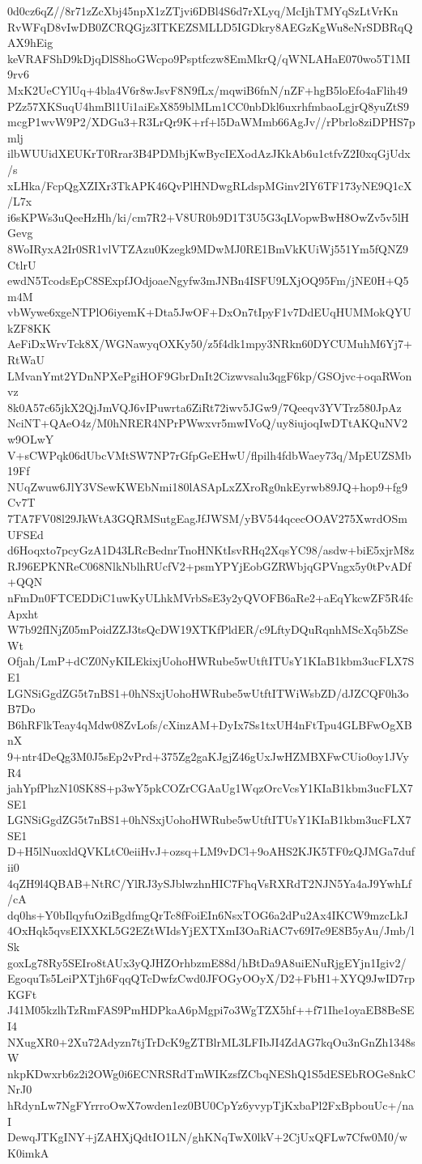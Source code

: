 0d0cz6qZ//8r71zZcXbj45npX1zZTjvi6DBl4S6d7rXLyq/McIjhTMYqSzLtVrKn
RvWFqD8vIwDB0ZCRQGjz3ITKEZSMLLD5IGDkry8AEGzKgWu8eNrSDBRqQAX9hEig
keVRAFShD9kDjqDlS8hoGWcpo9Psptfczw8EmMkrQ/qWNLAHaE070wo5T1MI9rv6
MxK2UeCYlUq+4bla4V6r8wJsvF8N9fLx/mqwiB6fnN/nZF+hgB5loEfo4aFlih49
PZz57XKSuqU4hmBl1Ui1aiEsX859blMLm1CC0nbDkl6uxrhfmbaoLgjrQ8yuZtS9
mcgP1wvW9P2/XDGu3+R3LrQr9K+rf+l5DaWMmb66AgJv//rPbrlo8ziDPHS7pmlj
ilbWUUidXEUKrT0Rrar3B4PDMbjKwBycIEXodAzJKkAb6u1ctfvZ2I0xqGjUdx/s
xLHka/FcpQgXZIXr3TkAPK46QvPlHNDwgRLdspMGinv2IY6TF173yNE9Q1cX/L7x
i6sKPWs3uQeeHzHh/ki/cm7R2+V8UR0b9D1T3U5G3qLVopwBwH8OwZv5v5lHGevg
8WoIRyxA2Ir0SR1vlVTZAzu0Kzegk9MDwMJ0RE1BmVkKUiWj551Ym5fQNZ9CtlrU
ewdN5TcodsEpC8SExpfJOdjoaeNgyfw3mJNBn4ISFU9LXjOQ95Fm/jNE0H+Q5m4M
vbWywe6xgeNTPlO6iyemK+Dta5JwOF+DxOn7tIpyF1v7DdEUqHUMMokQYUkZF8KK
AeFiDxWrvTck8X/WGNawyqOXKy50/z5f4dk1mpy3NRkn60DYCUMuhM6Yj7+RtWaU
LMvanYmt2YDnNPXePgiHOF9GbrDnIt2Cizwvsalu3qgF6kp/GSOjvc+oqaRWonvz
8k0A57c65jkX2QjJmVQJ6vIPuwrta6ZiRt72iwv5JGw9/7Qeeqv3YVTrz580JpAz
NciNT+QAeO4z/M0hNRER4NPrPWwxvr5mwIVoQ/uy8iujoqIwDTtAKQuNV2w9OLwY
V+sCWPqk06dUbcVMtSW7NP7rGfpGeEHwU/flpilh4fdbWaey73q/MpEUZSMb19Ff
NUqZwuw6JlY3VSewKWEbNmi180lASApLxZXroRg0nkEyrwb89JQ+hop9+fg9Cv7T
7TA7FV08l29JkWtA3GQRMSutgEagJfJWSM/yBV544qcecOOAV275XwrdOSmUFSEd
d6Hoqxto7pcyGzA1D43LRcBednrTnoHNKtIsvRHq2XqsYC98/asdw+biE5xjrM8z
RJ96EPKNReC068NlkNblhRUcfV2+psmYPYjEobGZRWbjqGPVngx5y0tPvADf+QQN
nFmDn0FTCEDDiC1uwKyULhkMVrbSsE3y2yQVOFB6aRe2+aEqYkcwZF5R4fcApxht
W7b92fINjZ05mPoidZZJ3tsQcDW19XTKfPldER/c9LftyDQuRqnhMScXq5bZSeWt
Ofjah/LmP+dCZ0NyKILEkixjUohoHWRube5wUtftITUsY1KIaB1kbm3ucFLX7SE1
LGNSiGgdZG5t7nBS1+0hNSxjUohoHWRube5wUtftITWiWsbZD/dJZCQF0h3oB7Do
B6hRFlkTeay4qMdw08ZvLofs/cXinzAM+DyIx7Ss1txUH4nFtTpu4GLBFwOgXBnX
9+ntr4DeQg3M0J5sEp2vPrd+375Zg2gaKJgjZ46gUxJwHZMBXFwCUio0oy1JVyR4
jahYpfPhzN10SK8S+p3wY5pkCOZrCGAaUg1WqzOrcVcsY1KIaB1kbm3ucFLX7SE1
LGNSiGgdZG5t7nBS1+0hNSxjUohoHWRube5wUtftITUsY1KIaB1kbm3ucFLX7SE1
D+H5lNuoxldQVKLtC0eiiHvJ+ozsq+LM9vDCl+9oAHS2KJK5TF0zQJMGa7dufii0
4qZH9l4QBAB+NtRC/YlRJ3ySJblwzhnHIC7FhqVsRXRdT2NJN5Ya4aJ9YwhLf/cA
dq0hs+Y0bIlqyfuOziBgdfmgQrTc8fFoiEIn6NsxTOG6a2dPu2Ax4IKCW9mzcLkJ
4OxHqk5qvsEIXXKL5G2EZtWIdsYjEXTXmI3OaRiAC7v69I7e9E8B5yAu/Jmb/lSk
goxLg78Ry5SEIro8tAUx3yQJHZOrhbzmE88d/hBtDa9A8uiENuRjgEYjn1Igiv2/
EgoquTs5LeiPXTjh6FqqQTcDwfzCwd0JFOGyOOyX/D2+FbH1+XYQ9JwID7rpKGFt
J41M05kzlhTzRmFAS9PmHDPkaA6pMgpi7o3WgTZX5hf++f71Ihe1oyaEB8BeSEI4
NXugXR0+2Xu72Adyzn7tjTrDcK9gZTBlrML3LFIbJI4ZdAG7kqOu3nGnZh1348sW
nkpKDwxrb6z2i2OWg0i6ECNRSRdTmWIKzsfZCbqNEShQ1S5dESEbROGe8nkCNrJ0
hRdynLw7NgFYrrroOwX7owden1ez0BU0CpYz6yvypTjKxbaPl2FxBpbouUc+/naI
DewqJTKgINY+jZAHXjQdtIO1LN/ghKNqTwX0lkV+2CjUxQFLw7Cfw0M0/wK0imkA

